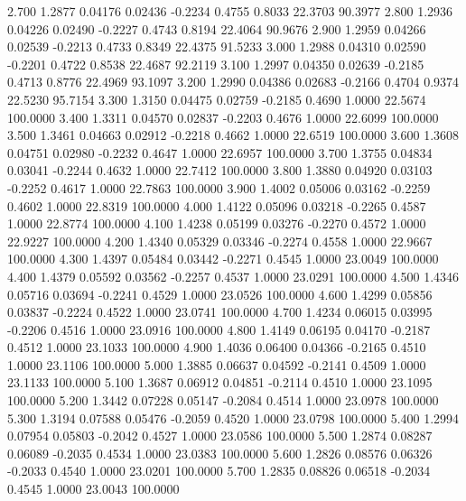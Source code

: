    2.700   1.2877   0.04176   0.02436  -0.2234   0.4755   0.8033  22.3703  90.3977
   2.800   1.2936   0.04226   0.02490  -0.2227   0.4743   0.8194  22.4064  90.9676
   2.900   1.2959   0.04266   0.02539  -0.2213   0.4733   0.8349  22.4375  91.5233
   3.000   1.2988   0.04310   0.02590  -0.2201   0.4722   0.8538  22.4687  92.2119
   3.100   1.2997   0.04350   0.02639  -0.2185   0.4713   0.8776  22.4969  93.1097
   3.200   1.2990   0.04386   0.02683  -0.2166   0.4704   0.9374  22.5230  95.7154
   3.300   1.3150   0.04475   0.02759  -0.2185   0.4690   1.0000  22.5674 100.0000
   3.400   1.3311   0.04570   0.02837  -0.2203   0.4676   1.0000  22.6099 100.0000
   3.500   1.3461   0.04663   0.02912  -0.2218   0.4662   1.0000  22.6519 100.0000
   3.600   1.3608   0.04751   0.02980  -0.2232   0.4647   1.0000  22.6957 100.0000
   3.700   1.3755   0.04834   0.03041  -0.2244   0.4632   1.0000  22.7412 100.0000
   3.800   1.3880   0.04920   0.03103  -0.2252   0.4617   1.0000  22.7863 100.0000
   3.900   1.4002   0.05006   0.03162  -0.2259   0.4602   1.0000  22.8319 100.0000
   4.000   1.4122   0.05096   0.03218  -0.2265   0.4587   1.0000  22.8774 100.0000
   4.100   1.4238   0.05199   0.03276  -0.2270   0.4572   1.0000  22.9227 100.0000
   4.200   1.4340   0.05329   0.03346  -0.2274   0.4558   1.0000  22.9667 100.0000
   4.300   1.4397   0.05484   0.03442  -0.2271   0.4545   1.0000  23.0049 100.0000
   4.400   1.4379   0.05592   0.03562  -0.2257   0.4537   1.0000  23.0291 100.0000
   4.500   1.4346   0.05716   0.03694  -0.2241   0.4529   1.0000  23.0526 100.0000
   4.600   1.4299   0.05856   0.03837  -0.2224   0.4522   1.0000  23.0741 100.0000
   4.700   1.4234   0.06015   0.03995  -0.2206   0.4516   1.0000  23.0916 100.0000
   4.800   1.4149   0.06195   0.04170  -0.2187   0.4512   1.0000  23.1033 100.0000
   4.900   1.4036   0.06400   0.04366  -0.2165   0.4510   1.0000  23.1106 100.0000
   5.000   1.3885   0.06637   0.04592  -0.2141   0.4509   1.0000  23.1133 100.0000
   5.100   1.3687   0.06912   0.04851  -0.2114   0.4510   1.0000  23.1095 100.0000
   5.200   1.3442   0.07228   0.05147  -0.2084   0.4514   1.0000  23.0978 100.0000
   5.300   1.3194   0.07588   0.05476  -0.2059   0.4520   1.0000  23.0798 100.0000
   5.400   1.2994   0.07954   0.05803  -0.2042   0.4527   1.0000  23.0586 100.0000
   5.500   1.2874   0.08287   0.06089  -0.2035   0.4534   1.0000  23.0383 100.0000
   5.600   1.2826   0.08576   0.06326  -0.2033   0.4540   1.0000  23.0201 100.0000
   5.700   1.2835   0.08826   0.06518  -0.2034   0.4545   1.0000  23.0043 100.0000
